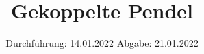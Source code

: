 

\subject{VERSUCH 106}
\title{Gekoppelte Pendel}
\date{%
  Durchführung: 14.01.2022
  \hspace{3em}
  Abgabe: 21.01.2022
}



\maketitle
\thispagestyle{empty}
\tableofcontents
\newpage








\printbibliography{}


